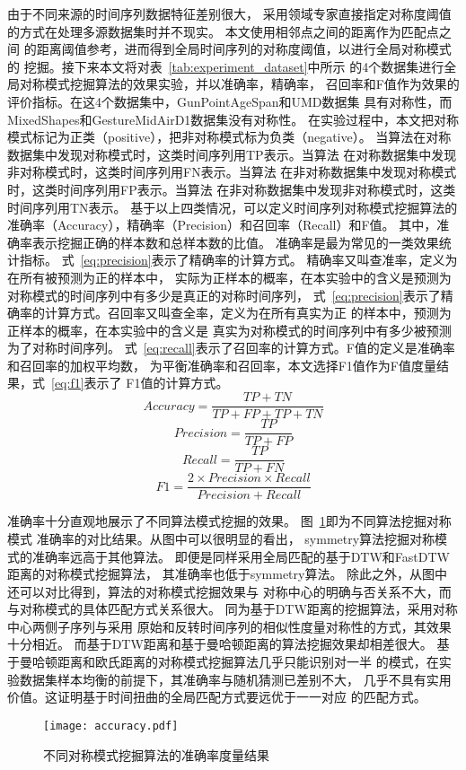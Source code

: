 由于不同来源的时间序列数据特征差别很大，
采用领域专家直接指定对称度阈值的方式在处理多源数据集时并不现实。
本文使用相邻点之间的距离作为匹配点之间
的距离阈值参考，进而得到全局时间序列的对称度阈值，以进行全局对称模式的
挖掘。接下来本文将对表~\ref{tab:experiment_dataset}中所示
的4个数据集进行全局对称模式挖掘算法的效果实验，并以准确率，精确率，
召回率和F值作为效果的评价指标。在这4个数据集中，GunPointAgeSpan和UMD数据集
具有对称性，而MixedShapes和GestureMidAirD1数据集没有对称性。
在实验过程中，本文把对称模式标记为正类（positive），把非对称模式标为负类（negative）。
当算法在对称数据集中发现对称模式时，这类时间序列用TP表示。当算法
在对称数据集中发现非对称模式时，这类时间序列用FN表示。当算法
在非对称数据集中发现对称模式时，这类时间序列用FP表示。当算法
在非对称数据集中发现非对称模式时，这类时间序列用TN表示。
基于以上四类情况，可以定义时间序列对称模式挖掘算法的
准确率（Accuracy），精确率（Precision）和召回率（Recall）和F值。
其中，准确率表示挖掘正确的样本数和总样本数的比值。
准确率是最为常见的一类效果统计指标。
式~\ref{eq:precision}表示了精确率的计算方式。
精确率又叫查准率，定义为在所有被预测为正的样本中，
实际为正样本的概率，在本实验中的含义是预测为对称模式的时间序列中有多少是真正的对称时间序列，
式~\ref{eq:precision}表示了精确率的计算方式。召回率又叫查全率，定义为在所有真实为正
的样本中，预测为正样本的概率，在本实验中的含义是
真实为对称模式的时间序列中有多少被预测为了对称时间序列。
式~\ref{eq:recall}表示了召回率的计算方式。F值的定义是准确率和召回率的加权平均数，
为平衡准确率和召回率，本文选择F1值作为F值度量结果，式~\ref{eq:f1}表示了
F1值的计算方式。
\begin{equation}
  Accuracy=\frac{TP+TN}{TP+FP+TP+TN}
  \label{eq:Accuracy}
\end{equation}
\begin{equation}
  Precision=\frac{TP}{TP+FP}
  \label{eq:precision}
\end{equation}
\begin{equation}
  Recall=\frac{TP}{TP+FN}
  \label{eq:recall}
\end{equation}
\begin{equation}
  F1=\frac{2 \times Precision \times Recall}{Precision+Recall}
  \label{eq:f1}
\end{equation}

准确率十分直观地展示了不同算法模式挖掘的效果。
图~\ref{fig:accuracy_compare}即为不同算法挖掘对称模式
准确率的对比结果。从图中可以很明显的看出，
symmetry算法挖掘对称模式的准确率远高于其他算法。
即便是同样采用全局匹配的基于DTW和FastDTW距离的对称模式挖掘算法，
其准确率也低于symmetry算法。
除此之外，从图中还可以对比得到，算法的对称模式挖掘效果与
对称中心的明确与否关系不大，而与对称模式的具体匹配方式关系很大。
同为基于DTW距离的挖掘算法，采用对称中心两侧子序列与采用
原始和反转时间序列的相似性度量对称性的方式，其效果十分相近。
而基于DTW距离和基于曼哈顿距离的算法挖掘效果却相差很大。
基于曼哈顿距离和欧氏距离的对称模式挖掘算法几乎只能识别对一半
的模式，在实验数据集样本均衡的前提下，其准确率与随机猜测已差别不大，
几乎不具有实用价值。这证明基于时间扭曲的全局匹配方式要远优于一一对应
的匹配方式。
\begin{figure}
  \centering
  \texttt{[image: accuracy.pdf]}
  \caption{不同对称模式挖掘算法的准确率度量结果}
  \label{fig:accuracy_compare}
\end{figure}


